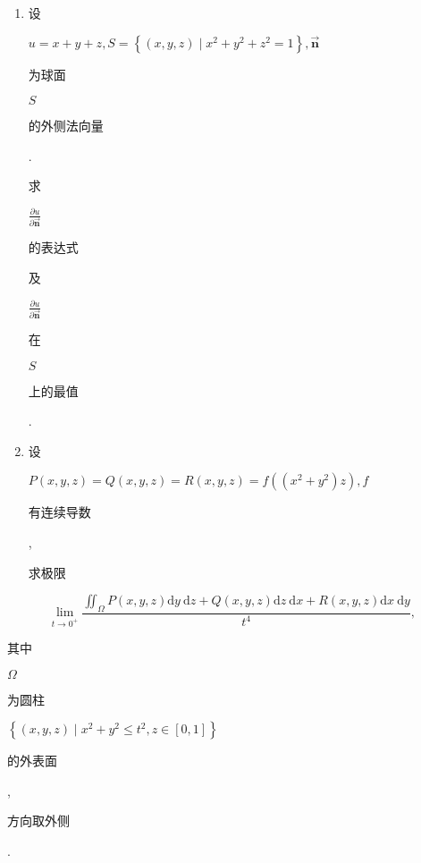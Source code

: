 \documentclass[10pt]{article}
\begin{document}
\begin{enumerate}
  \item \begin{CJK}{UTF8}{mj}设\end{CJK} $u=x+y+z, S=\left\{(x, y, z) \mid x^{2}+y^{2}+z^{2}=1\right\}, \overrightarrow{\mathbf{n}}$ \begin{CJK}{UTF8}{mj}为球面\end{CJK} $S$ \begin{CJK}{UTF8}{mj}的外侧法向量\end{CJK}. \begin{CJK}{UTF8}{mj}求\end{CJK} $\frac{\partial u}{\partial \overrightarrow{\mathbf{n}}}$ \begin{CJK}{UTF8}{mj}的表达式\end{CJK} \begin{CJK}{UTF8}{mj}及\end{CJK} $\frac{\partial u}{\partial \overrightarrow{\mathbf{n}}}$ \begin{CJK}{UTF8}{mj}在\end{CJK} $S$ \begin{CJK}{UTF8}{mj}上的最值\end{CJK}.

  \item \begin{CJK}{UTF8}{mj}设\end{CJK} $P(x, y, z)=Q(x, y, z)=R(x, y, z)=f\left(\left(x^{2}+y^{2}\right) z\right), f$ \begin{CJK}{UTF8}{mj}有连续导数\end{CJK}, \begin{CJK}{UTF8}{mj}求极限\end{CJK}

\end{enumerate}
$$
\lim _{t \rightarrow 0^{+}} \frac{\iint_{\Omega} P(x, y, z) \mathrm{d} y \mathrm{~d} z+Q(x, y, z) \mathrm{d} z \mathrm{~d} x+R(x, y, z) \mathrm{d} x \mathrm{~d} y}{t^{4}},
$$
\begin{CJK}{UTF8}{mj}其中\end{CJK} $\Omega$ \begin{CJK}{UTF8}{mj}为圆柱\end{CJK} $\left\{(x, y, z) \mid x^{2}+y^{2} \leqslant t^{2}, z \in[0,1]\right\}$ \begin{CJK}{UTF8}{mj}的外表面\end{CJK}, \begin{CJK}{UTF8}{mj}方向取外侧\end{CJK}.
\end{document}
